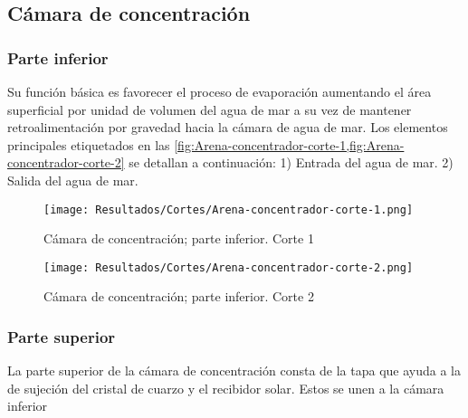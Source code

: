 		\subsection{Cámara de concentración}
			
			\subsubsection{Parte inferior}
				
				Su función básica es favorecer el proceso de evaporación aumentando el área superficial por unidad de volumen del agua de mar a su vez de mantener retroalimentación por gravedad hacia la cámara de agua de mar. Los elementos principales etiquetados en las \cref{fig:Arena-concentrador-corte-1,fig:Arena-concentrador-corte-2} se detallan a continuación: 1) Entrada del agua de mar. 2) Salida del agua de mar.
			
				\begin{figure}[H]
					\centering
					\texttt{[image: Resultados/Cortes/Arena-concentrador-corte-1.png]}
					\caption{Cámara de concentración; parte inferior. Corte 1}
					\label{fig:Arena-concentrador-corte-1}
				\end{figure}
				
				\begin{figure}[H]
					\centering
					\texttt{[image: Resultados/Cortes/Arena-concentrador-corte-2.png]}
					\caption{Cámara de concentración; parte inferior. Corte 2}
					\label{fig:Arena-concentrador-corte-2}
				\end{figure}
			
			\subsubsection{Parte superior}
				
				La parte superior de la cámara de concentración consta de la tapa que ayuda a la de sujeción del cristal de cuarzo y el recibidor solar. Estos se unen a la cámara inferior
			
